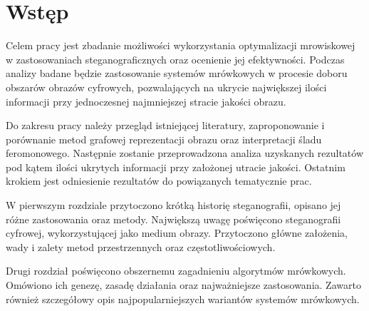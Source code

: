 
\chapter*{Wstęp}\label{chap:intro}
{



    Celem pracy jest zbadanie możliwości wykorzystania optymalizacji mrowiskowej w zastosowaniach steganograficznych
    oraz ocenienie jej efektywności. Podczas analizy badane będzie zastosowanie systemów mrówkowych w procesie doboru
    obszarów obrazów cyfrowych, pozwalających na ukrycie największej ilości informacji przy jednoczesnej najmniejszej
    stracie jakości obrazu.

    Do zakresu pracy należy przegląd istniejącej literatury, zaproponowanie i porównanie metod grafowej reprezentacji
    obrazu oraz interpretacji śladu feromonowego. Następnie zostanie przeprowadzona analiza uzyskanych
    rezultatów pod kątem ilości ukrytych informacji przy założonej utracie jakości. Ostatnim krokiem jest odniesienie
    rezultatów do powiązanych tematycznie prac.

    W pierwszym rozdziale przytoczono krótką historię steganografii, opisano jej różne zastosowania oraz metody.
    Największą uwagę poświęcono steganografii cyfrowej, wykorzystującej jako medium obrazy. Przytoczono główne
    założenia, wady i zalety metod przestrzennych oraz częstotliwościowych.

    Drugi rozdział poświęcono obszernemu zagadnieniu algorytmów mrówkowych. Omówiono ich genezę, zasadę działania oraz
    najważniejsze zastosowania. Zawarto również szczegółowy opis najpopularniejszych wariantów systemów mrówkowych.

}
